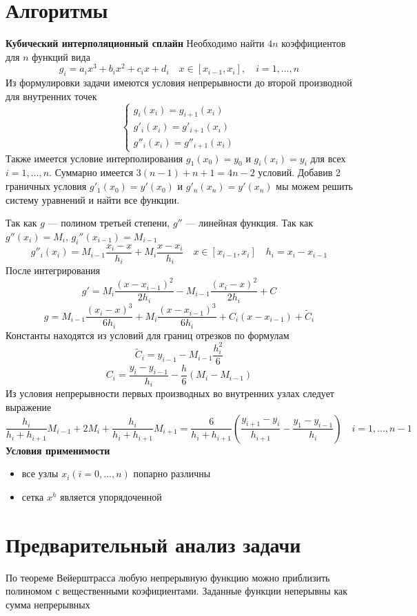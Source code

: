 \documentclass[a4paper]{article}
\begin{document}
\section{Алгоритмы}
\textbf{Кубический интерполяционный сплайн}
Необходимо найти \(4n\) коэффициентов для \(n\) функций вида \[
  g_{i} = a_{i}x^{3} + b_{i}x^{2} + c_{i}x + d_{i} \quad x \in [x_{i-1},x_{i}], \quad  i = 1, \ldots , n
\]
Из формулировки задачи имеются условия непрерывности до второй производной для
внутренних точек \[
  \begin{cases}
    g_{i}(x_{i}) = g_{i+1}(x_{i})\\
    g'_{i}(x_{i}) = g'_{i+1}(x_{i})\\
    g''_{i}(x_{i}) = g''_{i+1}(x_{i})
  \end{cases}
\]
Также имеется условие интерполирования \(g_{1}(x_{0}) = y_{0}\) и
\(g_{i}(x_{i}) = y_{i}\) для всех \(i = 1,\ldots,n\). Суммарно имеется
\(3(n-1)+n+1=4n-2\) условий. Добавив 2 граничных условия
\(g'_{1}(x_{0}) = y'(x_{0})\) и \(g'_{n}(x_{n}) = y'(x_{n})\) мы можем решить
систему уравнений и найти все функции.

Так как \(g\) --- полином третьей степени, \(g''\) --- линейная функция. Так как
\(g''(x_{i}) = M_{i}\), \(g_{i}''(x_{i-1}) = M_{i-1}\) \[
  g''_{i}(x_{i}) = M_{i-1} \frac{x_{i}-x}{h_{i}} + M_{i} \frac{x-x_{i}}{h_{i}} \quad x \in [x_{i-1},x_{i}] \quad h_{i} = x_{i} - x_{i-1}
\]
После интегрирования \[
  g' = M_{i} \frac{(x-x_{i-1})^{2}}{2h_{i}} - M_{i-1} \frac{(x_{i}-x)^{2}}{2h_{i}} + C
\]\[
  g = M_{i-1} \frac{(x_{i}-x)^{3}}{6h_{i}} + M_{i} \frac{(x-x_{i-1})^{3}}{6h_{i}} + C_{i}(x-x_{i-1}) + \tilde{C}_{i}
\]
Константы находятся из условий для границ отрезков по формулам \[
  \tilde{C}_{i} = y_{i-1} - M_{i-1} \frac{h_{i}^{2}}{6}
\]\[
  C_{i} = \frac{y_{i}-y_{i-1}}{h_{i}} - \frac{h}{6} \left(M_{i} - M_{i-1}\right)
\]
Из условия непрерывности первых производных во внутренних узлах следует выражение \[
  \frac{h_{i}}{h_{i}+h_{i+1}} M_{i-1} + 2M_{i} + \frac{h_{i}}{h_{i}+h_{i+1}}M_{i+1} = \frac{6}{h_{i}+h_{i+1}}\left( \frac{y_{i+1}-y_{i}}{h_{i+1}} - \frac{y_{1}-y_{i-1}}{h_{i}}\right) \quad i = 1,\ldots,n-1
\]
\textbf{Условия применимости}
\begin{itemize}
  \item все узлы \(x_{i} (i = 0,\ldots,n)\) попарно различны
  \item сетка \(x^{h}\) является упорядоченной
\end{itemize}
\section{Предварительный анализ задачи}
По теореме Вейерштрасса любую непрерывную функцию можно приблизить полиномом с вещественными коэфициентами. Заданные
функции неперывны как сумма непрерывных
\end{document}
